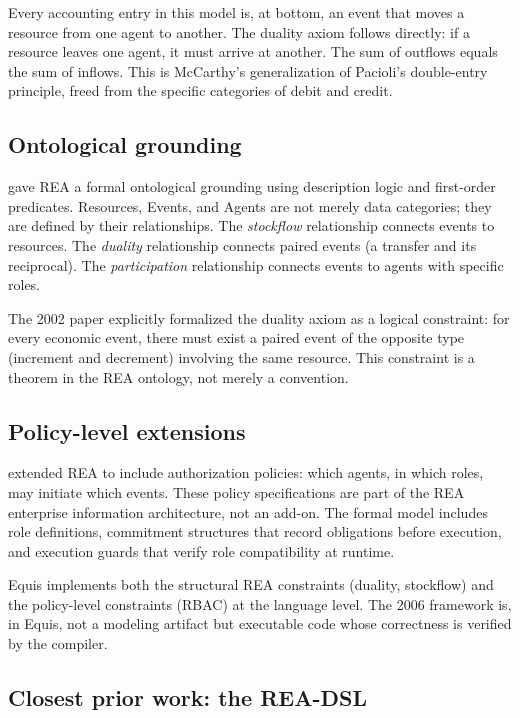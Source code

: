 \documentclass[11pt,a4paper]{article}
\theoremstyle{remark}
\begin{document}
Every accounting entry in this model is, at bottom, an event that moves
a resource from one agent to another. The duality axiom follows
directly: if a resource leaves one agent, it must arrive at another. The
sum of outflows equals the sum of inflows. This is McCarthy's
generalization of Pacioli's double-entry principle, freed from the
specific categories of debit and credit.

\subsection{Ontological grounding}

\citet{geerts_ontological_1999,geerts_ontological_2002} gave REA a formal
ontological grounding using description logic and first-order
predicates. Resources, Events, and Agents are not merely data
categories; they are defined by their relationships. The
\emph{stockflow} relationship connects events to resources. The
\emph{duality} relationship connects paired events (a transfer and its
reciprocal). The \emph{participation} relationship connects events to
agents with specific roles.

The 2002 paper explicitly formalized the duality axiom as a logical
constraint: for every economic event, there must exist a paired event of
the opposite type (increment and decrement) involving the same resource.
This constraint is a theorem in the REA ontology, not merely a
convention.

\subsection{Policy-level extensions}

\citet{geerts_policy-level_2006} extended REA to include authorization
policies: which agents, in which roles, may initiate which events.
These policy specifications are part of the REA enterprise information
architecture, not an add-on. The formal model includes role definitions,
commitment structures that record obligations before execution, and
execution guards that verify role compatibility at runtime.

Equis implements both the structural REA constraints (duality,
stockflow) and the policy-level constraints (RBAC) at the language
level. The 2006 framework is, in Equis, not a modeling artifact but
executable code whose correctness is verified by the compiler.

\subsection{Closest prior work: the REA-DSL}
\end{document}

